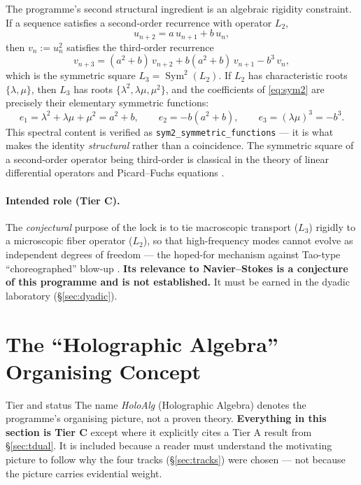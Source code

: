 \documentclass[11pt,a4paper]{article}
\newcommand{\tC}{\textcolor{TierC}{\textbf{Tier C}}}
\theoremstyle{definition}
\theoremstyle{plain}
\begin{document}
The programme's second structural ingredient is an algebraic rigidity constraint. If a
sequence satisfies a second-order recurrence with operator $L_2$,
\[
u_{n+2}=a\,u_{n+1}+b\,u_n ,
\]
then $v_n := u_n^2$ satisfies the third-order recurrence
\begin{equation}
v_{n+3}=(a^2+b)\,v_{n+2}+b(a^2+b)\,v_{n+1}-b^3\,v_n ,
\label{eq:sym2}
\end{equation}
which is the symmetric square $L_3=\operatorname{Sym}^2(L_2)$. If $L_2$ has characteristic
roots $\{\lambda,\mu\}$, then $L_3$ has roots $\{\lambda^2,\lambda\mu,\mu^2\}$, and the
coefficients of \eqref{eq:sym2} are precisely their elementary symmetric functions:
\[
e_1=\lambda^2+\lambda\mu+\mu^2=a^2+b,\qquad
e_2=-b(a^2+b),\qquad
e_3=(\lambda\mu)^3=-b^3 .
\]
This spectral content is verified as \texttt{sym2\_symmetric\_functions} --- it is what makes
the identity \emph{structural} rather than a coincidence. The symmetric square of a
second-order operator being third-order is classical in the theory of linear differential
operators and Picard--Fuchs equations \cite{doran-sym2}.

\paragraph{Intended role (\tC{}).} The \emph{conjectural} purpose of the lock is to tie
macroscopic transport ($L_3$) rigidly to a microscopic fiber operator ($L_2$), so that
high-frequency modes cannot evolve as independent degrees of freedom --- the hoped-for
mechanism against Tao-type ``choreographed'' blow-up \cite{tao-averaged}. \textbf{Its
relevance to Navier--Stokes is a conjecture of this programme and is not established.} It
must be earned in the dyadic laboratory (\S\ref{sec:dyadic}).

\section{The ``Holographic Algebra'' Organising Concept}
\label{sec:holoalg}

\begin{warnbox}{Tier and status}
The name \emph{HoloAlg} (Holographic Algebra) denotes the programme's organising picture, not
a proven theory. \textbf{Everything in this section is \tC{}} except where it explicitly cites
a Tier A result from \S\ref{sec:tdual}. It is included because a reader must understand the
motivating picture to follow why the four tracks (\S\ref{sec:tracks}) were chosen --- not
because the picture carries evidential weight.
\end{warnbox}
\end{document}
